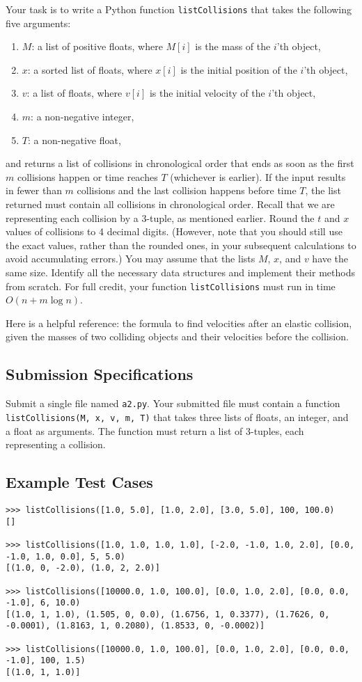 \documentclass{article}
\begin{document}
Your task is to write a Python function \texttt{listCollisions} that takes the following five arguments:
\begin{enumerate}
    \item $M$: a list of positive floats, where $M[i]$ is the mass of the $i$'th object,
    \item $x$: a sorted list of floats, where $x[i]$ is the initial position of the $i$'th object,
    \item $v$: a list of floats, where $v[i]$ is the initial velocity of the $i$'th object,
    \item $m$: a non-negative integer,
    \item $T$: a non-negative float,
\end{enumerate}
and returns a list of collisions in chronological order that ends as soon as the first $m$ collisions happen or time reaches $T$ (whichever is earlier). If the input results in fewer than $m$ collisions and the last collision happens before time $T$, the list returned must contain all collisions in chronological order. Recall that we are representing each collision by a 3-tuple, as mentioned earlier. Round the $t$ and $x$ values of collisions to 4 decimal digits. (However, note that you should still use the exact values, rather than the rounded ones, in your subsequent calculations to avoid accumulating errors.) You may assume that the lists $M$, $x$, and $v$ have the same size. Identify all the necessary data structures and implement their methods from scratch. For full credit, your function \texttt{listCollisions} must run in time $O(n + m \log n)$.

Here is a helpful reference: the formula to find velocities after an elastic collision, given the masses of two colliding objects and their velocities before the collision.

\subsection*{Submission Specifications}
Submit a single file named \texttt{a2.py}. Your submitted file must contain a function \texttt{listCollisions(M, x, v, m, T)} that takes three lists of floats, an integer, and a float as arguments. The function must return a list of 3-tuples, each representing a collision.

\subsection*{Example Test Cases}
\begin{verbatim}
>>> listCollisions([1.0, 5.0], [1.0, 2.0], [3.0, 5.0], 100, 100.0)
[]

>>> listCollisions([1.0, 1.0, 1.0, 1.0], [-2.0, -1.0, 1.0, 2.0], [0.0, -1.0, 1.0, 0.0], 5, 5.0)
[(1.0, 0, -2.0), (1.0, 2, 2.0)]

>>> listCollisions([10000.0, 1.0, 100.0], [0.0, 1.0, 2.0], [0.0, 0.0, -1.0], 6, 10.0)
[(1.0, 1, 1.0), (1.505, 0, 0.0), (1.6756, 1, 0.3377), (1.7626, 0, -0.0001), (1.8163, 1, 0.2080), (1.8533, 0, -0.0002)]

>>> listCollisions([10000.0, 1.0, 100.0], [0.0, 1.0, 2.0], [0.0, 0.0, -1.0], 100, 1.5)
[(1.0, 1, 1.0)]
\end{verbatim}
\end{document}
